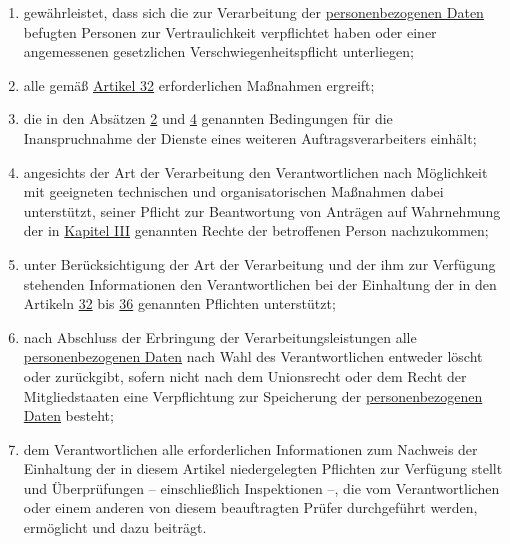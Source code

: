 \begin{enumerate}
\begin{enumerate}
    \item gewährleistet, dass sich die zur Verarbeitung der \hyperref[itm:04-1]{personenbezogenen Daten} befugten Personen zur
     Vertraulichkeit verpflichtet haben oder einer angemessenen gesetzlichen Verschwiegenheitspflicht unterliegen;
    \label{itm:28-3-1b}

    \item alle gemäß \hyperref[ch:32]{Artikel 32} erforderlichen Maßnahmen ergreift;
    \label{itm:28-3-1c}

    \item die in den Absätzen \hyperref[itm:28-2]{2} und \hyperref[itm:28-4]{4} genannten Bedingungen für die
     Inanspruchnahme der Dienste eines weiteren Auftragsverarbeiters einhält;
    \label{itm:28-3-1d}

    \item angesichts der Art der Verarbeitung den Verantwortlichen nach Möglichkeit mit geeigneten technischen und
     organisatorischen Maßnahmen dabei unterstützt, seiner Pflicht zur Beantwortung von Anträgen auf Wahrnehmung der in
     \hyperref[part:3]{Kapitel III} genannten Rechte der betroffenen Person nachzukommen;
    \label{itm:28-3-1e}

    \item unter Berücksichtigung der Art der Verarbeitung und der ihm zur Verfügung stehenden Informationen den
     Verantwortlichen bei der Einhaltung der in den Artikeln \hyperref[ch:32]{32} bis \hyperref[ch:36]{36} genannten
     Pflichten unterstützt;
    \label{itm:28-3-1f}

    \item nach Abschluss der Erbringung der Verarbeitungsleistungen alle \hyperref[itm:04-1]{personenbezogenen Daten} nach Wahl des
     Verantwortlichen entweder löscht oder zurückgibt, sofern nicht nach dem Unionsrecht oder dem Recht der
     Mitgliedstaaten eine Verpflichtung zur Speicherung der \hyperref[itm:04-1]{personenbezogenen Daten} besteht;
    \label{itm:28-3-1g}

    \item dem Verantwortlichen alle erforderlichen Informationen zum Nachweis der Einhaltung der in diesem Artikel
     niedergelegten Pflichten zur Verfügung stellt und Überprüfungen -- einschließlich Inspektionen –, die vom
     Verantwortlichen oder einem anderen von diesem beauftragten Prüfer durchgeführt werden, ermöglicht und dazu
     beiträgt.
    \label{itm:28-3-1h}

  \end{enumerate}


\end{enumerate}
